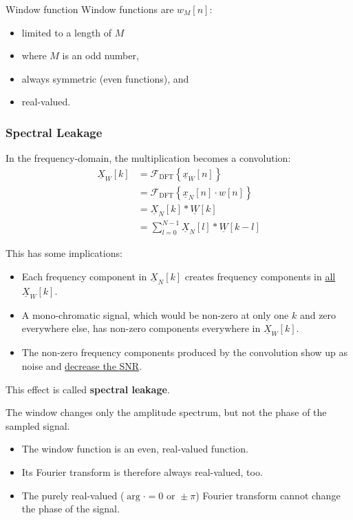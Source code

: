 \begin{refsection}
\begin{definition}{Window function}
	Window functions are $w_M[n]$:
	\begin{itemize}
		\item limited to a length of $M$
		\item where $M$ is an odd number,
		\item always symmetric (even functions), and
		\item real-valued.
	\end{itemize}
\end{definition}

\subsubsection{Spectral Leakage}

In the frequency-domain, the multiplication becomes a convolution:
\begin{equation}
	\begin{split}
		\underline{X}_W[k] &= \mathcal{F}_{\text{DFT}}\left\{\underline{x}_W[n]\right\} \\
		 &= \mathcal{F}_{\text{DFT}}\left\{\underline{x}_N[n] \cdot w[n]\right\} \\
		 &= \underline{X}_N[k] * \underline{W}[k] \\
		 &= \sum\limits_{l=0}^{N-1} \underline{X}_N[l] * \underline{W}[k-l]
	\end{split}
\end{equation}

This has some implications:
\begin{itemize}
	\item Each frequency component in $\underline{X}_N[k]$ creates frequency components in \underline{all} $\underline{X}_W[k]$.
	\item A mono-chromatic signal, which would be non-zero at only one $k$ and zero everywhere else, has non-zero components everywhere in $\underline{X}_W[k]$.
	\item The non-zero frequency components produced by the convolution show up as noise and \underline{decrease the \ac{SNR}}.
\end{itemize}
This effect is called  \textbf{spectral leakage}.

\begin{fact}
	The window changes only the amplitude spectrum, but not the phase of the sampled signal.
\end{fact}
\begin{itemize}
	\item The window function is an even, real-valued function.
	\item Its Fourier transform is therefore always real-valued, too.
	\item The purely real-valued ($\arg{\cdot} = 0 \text{ or } \pm \pi$) Fourier transform cannot change the phase of the signal.
\end{itemize}



\end{refsection}

